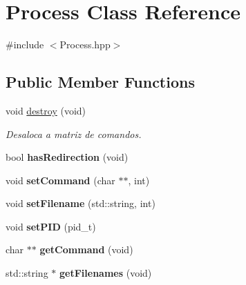 \hypertarget{classProcess}{
\section{Process Class Reference}
\label{classProcess}
}


{\ttfamily \#include $<$Process.hpp$>$}

\subsection*{Public Member Functions}
\begin{DoxyCompactItemize}
\item 
\hypertarget{classProcess_a171e59c307275297e3e1af1db84573cd}{
void \hyperlink{classProcess_a171e59c307275297e3e1af1db84573cd}{destroy} (void)}
\label{classProcess_a171e59c307275297e3e1af1db84573cd}

\begin{DoxyCompactList}\small\item\em Desaloca a matriz de comandos. \end{DoxyCompactList}\item 
\hypertarget{classProcess_ad61ee8eb2717e58335c77a644c636481}{
bool {\bfseries hasRedirection} (void)}
\label{classProcess_ad61ee8eb2717e58335c77a644c636481}

\item 
\hypertarget{classProcess_af07d9b99e85006a092ff5bfd02f9870e}{
void {\bfseries setCommand} (char $\ast$$\ast$, int)}
\label{classProcess_af07d9b99e85006a092ff5bfd02f9870e}

\item 
\hypertarget{classProcess_ae70e6cd440d972f6be31b9990241e629}{
void {\bfseries setFilename} (std::string, int)}
\label{classProcess_ae70e6cd440d972f6be31b9990241e629}

\item 
\hypertarget{classProcess_a1fe062af26e2daece35c52185b3e5041}{
void {\bfseries setPID} (pid\_\-t)}
\label{classProcess_a1fe062af26e2daece35c52185b3e5041}

\item 
\hypertarget{classProcess_a673f9fa73be0dc8ce7671ec936506523}{
char $\ast$$\ast$ {\bfseries getCommand} (void)}
\label{classProcess_a673f9fa73be0dc8ce7671ec936506523}

\item 
\hypertarget{classProcess_a1a31bd04c45cd937a94cb44e16756903}{
std::string $\ast$ {\bfseries getFilenames} (void)}
\label{classProcess_a1a31bd04c45cd937a94cb44e16756903}


\end{DoxyCompactItemize}
